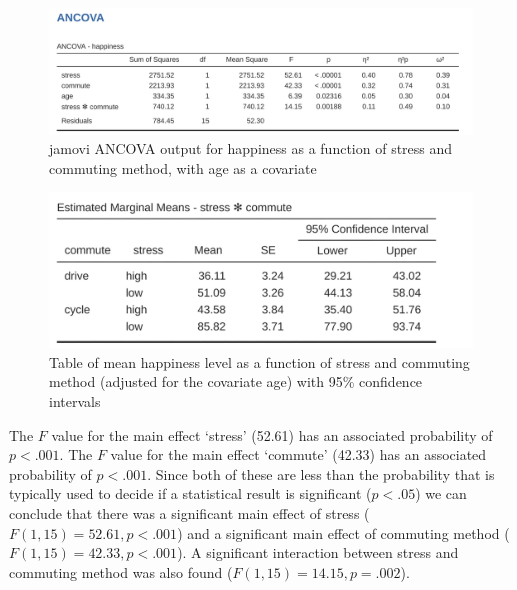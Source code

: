 \documentclass[
  a4paper,
]{book}
\begin{document}
\begin{figure}

\includegraphics[width=1\textwidth,height=\textheight]{images/fig14-13.png} \hfill{}

\caption{\label{fig-fig14-13}jamovi ANCOVA output for happiness as a
function of stress and commuting method, with age as a covariate}

\end{figure}

\begin{figure}

\includegraphics[width=1\textwidth,height=\textheight]{images/fig14-14.png} \hfill{}

\caption{\label{fig-fig14-14}Table of mean happiness level as a function
of stress and commuting method (adjusted for the covariate age) with
95\% confidence intervals}

\end{figure}

The \(F\) value for the main effect `stress' (52.61) has an associated
probability of \(p < .001\). The \(F\) value for the main effect
`commute' (42.33) has an associated probability of \(p < .001\). Since
both of these are less than the probability that is typically used to
decide if a statistical result is significant (\(p < .05\)) we can
conclude that there was a significant main effect of stress
(\(F(1, 15) = 52.61, p < .001\)) and a significant main effect of
commuting method (\(F(1, 15) = 42.33, p < .001\)). A significant
interaction between stress and commuting method was also found
(\(F(1, 15) = 14.15, p = .002\)).
\end{document}
